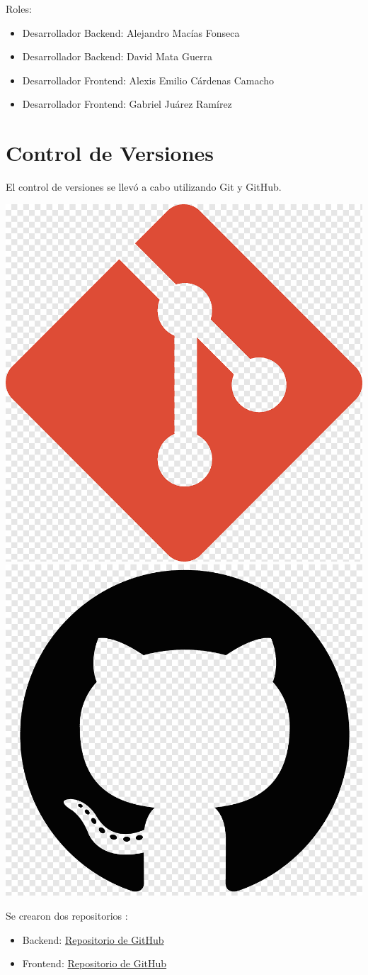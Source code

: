 	Roles: 
	\begin{itemize}
		\item Desarrollador Backend: Alejandro Macías Fonseca
		\item Desarrollador Backend: David Mata Guerra
		\item Desarrollador Frontend: Alexis Emilio Cárdenas Camacho
		\item Desarrollador Frontend: Gabriel Juárez Ramírez
	\end{itemize}
	
	\section{Control de Versiones}
	El control de versiones se llevó a cabo utilizando Git y GitHub. 
		\begin{center}
		\includegraphics[width=0.3\linewidth]{./images/gitlogo.png}
		\includegraphics[width=0.3\linewidth]{./images/github_logo.png}
	\end{center}


	Se crearon dos repositorios :
	\begin{itemize}
	  \item Backend: \href{https://github.com/dmataguerra/proyecto_final_ing_requerimientos_back}{Repositorio de GitHub}
		\item Frontend: \href{https://github.com/Alexiiis21/frontend.git}{Repositorio de GitHub}	
	\end{itemize}


